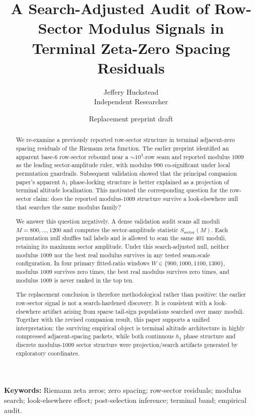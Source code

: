 \documentclass[11pt]{article}
\title{A Search-Adjusted Audit of Row-Sector Modulus Signals in Terminal Zeta-Zero Spacing Residuals}
\author{Jeffery Huckstead\\Independent Researcher}
\date{Replacement preprint draft}
\begin{document}
\maketitle

\begin{abstract}
We re-examine a previously reported row-sector structure in terminal adjacent-zero spacing residuals of the Riemann zeta function. The earlier preprint identified an apparent base-6 row-sector rebound near a \(\sim 10^3\)-row seam and reported modulus \(1009\) as the leading sector-amplitude ruler, with modulus \(990\) co-significant under local permutation guardrails. Subsequent validation showed that the principal companion paper's apparent \(h_1\) phase-locking structure is better explained as a projection of terminal altitude localization. This motivated the corresponding question for the row-sector claim: does the reported modulus-\(1009\) structure survive a look-elsewhere null that searches the same modulus family?

We answer this question negatively. A dense validation audit scans all moduli \(M=800,\ldots,1200\) and computes the sector-amplitude statistic \(S_{\mathrm{sector}}(M)\). Each permutation null shuffles tail labels and is allowed to scan the same 401 moduli, retaining its maximum sector amplitude. Under this search-adjusted null, neither modulus \(1009\) nor the best real modulus survives in any tested seam-scale configuration. In four primary fitted-ratio windows \(W\in\{900,1000,1100,1300\}\), modulus \(1009\) survives zero times, the best real modulus survives zero times, and modulus \(1009\) is never ranked in the top ten.

The replacement conclusion is therefore methodological rather than positive: the earlier row-sector signal is not a search-hardened discovery. It is consistent with a look-elsewhere artifact arising from sparse tail-sign populations searched over many moduli. Together with the revised companion result, this paper supports a unified interpretation: the surviving empirical object is terminal altitude architecture in highly compressed adjacent-spacing packets, while both continuous \(h_1\) phase structure and discrete modulus-\(1009\) sector structure were projection/search artifacts generated by exploratory coordinates.
\end{abstract}

\noindent\textbf{Keywords:} Riemann zeta zeros; zero spacing; row-sector residuals; modulus search; look-elsewhere effect; post-selection inference; terminal band; empirical audit.
\end{document}
